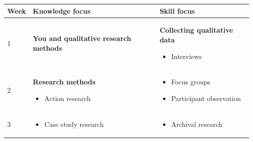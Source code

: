 \documentclass[]{book}
\providecommand{\tightlist}{%
  \setlength{\itemsep}{0pt}\setlength{\parskip}{0pt}}
\theoremstyle{definition}
\theoremstyle{definition}
\theoremstyle{definition}
\theoremstyle{remark}
\begin{document}
\begin{longtable}[]{@{}lll@{}}
\toprule
\begin{minipage}[b]{0.08\columnwidth}\raggedright
Week\strut
\end{minipage} & \begin{minipage}[b]{0.30\columnwidth}\raggedright
Knowledge focus\strut
\end{minipage} & \begin{minipage}[b]{0.54\columnwidth}\raggedright
Skill focus\strut
\end{minipage}\tabularnewline
\midrule
\endhead
\begin{minipage}[t]{0.08\columnwidth}\raggedright
1\strut
\end{minipage} & \begin{minipage}[t]{0.30\columnwidth}\raggedright
\textbf{You and qualitative research methods}\strut
\end{minipage} & \begin{minipage}[t]{0.54\columnwidth}\raggedright
\textbf{Collecting qualitative data}

\begin{itemize}
\tightlist
\item
  Interviews
\end{itemize}\strut
\end{minipage}\tabularnewline
\begin{minipage}[t]{0.08\columnwidth}\raggedright
2\strut
\end{minipage} & \begin{minipage}[t]{0.30\columnwidth}\raggedright
\textbf{Research methods}

\begin{itemize}
\tightlist
\item
  Action research
\end{itemize}\strut
\end{minipage} & \begin{minipage}[t]{0.54\columnwidth}\raggedright
\begin{itemize}
\tightlist
\item
  Focus groups
\item
  Participant observation
\end{itemize}\strut
\end{minipage}\tabularnewline
\begin{minipage}[t]{0.08\columnwidth}\raggedright
3\strut
\end{minipage} & \begin{minipage}[t]{0.30\columnwidth}\raggedright
\begin{itemize}
\tightlist
\item
  Case study research
\end{itemize}\strut
\end{minipage} & \begin{minipage}[t]{0.54\columnwidth}\raggedright
\begin{itemize}
\tightlist
\item
  Archival research
\end{itemize}


\end{minipage}
\end{longtable}
\end{document}
